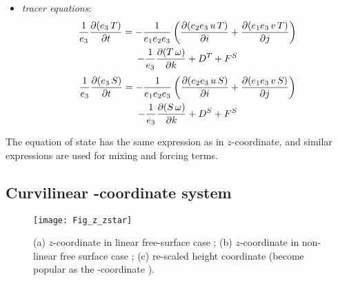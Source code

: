 \documentclass[../main/NEMO_manual]{subfiles}
\begin{document}
\begin{itemize}
\begin{multline*}
  \end{multline*}
  where the relative vorticity, $\zeta$, the surface pressure gradient,
  and the hydrostatic pressure have the same expressions as in $z$-coordinates although
  they do not represent exactly the same quantities.
  $\omega$ is provided by the continuity equation (see \autoref{apdx:A}):
  \[
    \pd[e_3]{t} + e_3 \; \chi + \pd[\omega]{s} = 0 \quad \text{with} \quad
    \chi = \frac{1}{e_1 e_2 e_3} \lt( \pd[(e_2 e_3 \, u)]{i} + \pd[(e_1 e_3 \, v)]{j} \rt)
  \]
\item \textit{tracer equations}:
  \begin{multline*}
    \frac{1}{e_3} \pd[(e_3 \, T)]{t} = - \frac{1}{e_1 e_2 e_3} \lt(   \pd[(e_2 e_3 \, u \, T)]{i}
                                                                    + \pd[(e_1 e_3 \, v \, T)]{j} \rt) \\
                                       - \frac{1}{e_3} \pd[(T \, \omega)]{k} + D^T + F^S
  \end{multline*}
  \begin{multline}
    \frac{1}{e_3} \pd[(e_3 \, S)]{t} = - \frac{1}{e_1 e_2 e_3} \lt(   \pd[(e_2 e_3 \, u \, S)]{i}
                                                                    + \pd[(e_1 e_3 \, v \, S)]{j} \rt) \\
                                       - \frac{1}{e_3} \pd[(S \, \omega)]{k} + D^S + F^S
  \end{multline}
\end{itemize}
The equation of state has the same expression as in $z$-coordinate,
and similar expressions are used for mixing and forcing terms.


\subsection{Curvilinear \zstar-coordinate system}
\label{subsec:PE_zco_star}

\begin{figure}[!b]
  \begin{center}
    \texttt{[image: Fig\_z\_zstar]}
    \caption{
      \protect\label{fig:z_zstar}
      (a) $z$-coordinate in linear free-surface case ;
      (b) $z$-coordinate in non-linear free surface case ;
      (c) re-scaled height coordinate
      (become popular as the \zstar-coordinate \citep{Adcroft_Campin_OM04}).
    }
  \end{center}
\end{figure}
\end{document}
